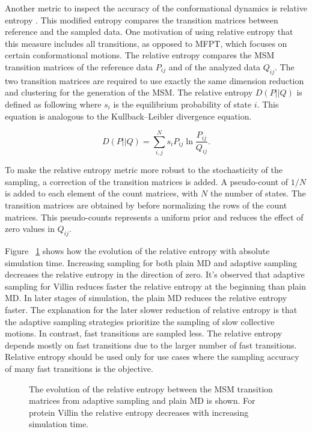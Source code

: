 Another metric to inspect the accuracy of the conformational dynamics is relative entropy \cite{bowman2010enhanced}. This modified entropy compares the transition matrices between reference and the sampled data. One motivation of using relative entropy that this measure includes all transitions, as opposed to MFPT, which focuses on certain conformational motions. 
The relative entropy compares the MSM transition matrices of the reference data $P_{ij}$ and of the analyzed data $Q_{ij}$. The two transition matrices are required to use exactly the same dimension reduction and clustering for the generation of the MSM. The relative entropy $D(P||Q)$ is defined as following where $s_{i}$ is the equilibrium probability of state $i$. This equation is analogous to the Kullback–Leibler divergence equation.

\begin{equation}
D(P||Q)=\sum_{i,j}^{N}s_{i}P_{ij}\ln\frac{P_{ij}}{Q_{ij}}. 
\end{equation}

To make the relative entropy metric more robust to the stochasticity of the sampling, a correction of the transition matrices is added. A pseudo-count of $1/N$ is added to each element of the count matrices, with $N$ the number of states. The transition matrices are obtained by before normalizing the rows of the count matrices. This pseudo-counts represents a uniform prior and reduces the effect of zero values in $Q_{ij}$.

Figure ~\ref{fig:rel_ent} shows how the evolution of the relative entropy with absolute simulation time. Increasing sampling for both plain MD and adaptive sampling decreases the relative entropy in the direction of zero. It's observed that adaptive sampling for Villin reduces faster the relative entropy at the beginning than plain MD. In later stages of simulation, the plain MD reduces the relative entropy faster. The explanation for the later slower reduction of relative entropy is that the adaptive sampling strategies prioritize the sampling of slow collective motions. In contrast, fast transitions are sampled less. The relative entropy depends mostly on fast transitions due to the larger number of fast transitions. Relative entropy should be used only for use cases where the sampling accuracy of many fast transitions is the objective.

\begin{figure}[H]
   \centering
   \begin{subfigure}[b]{0.7\linewidth}
   {}
   \end{subfigure}%
   
  \caption{
  The evolution of the relative entropy between the MSM transition matrices from adaptive sampling and plain MD is shown.  For protein Villin the relative entropy decreases with increasing simulation time.}
  \label{fig:rel_ent}
\end{figure}



